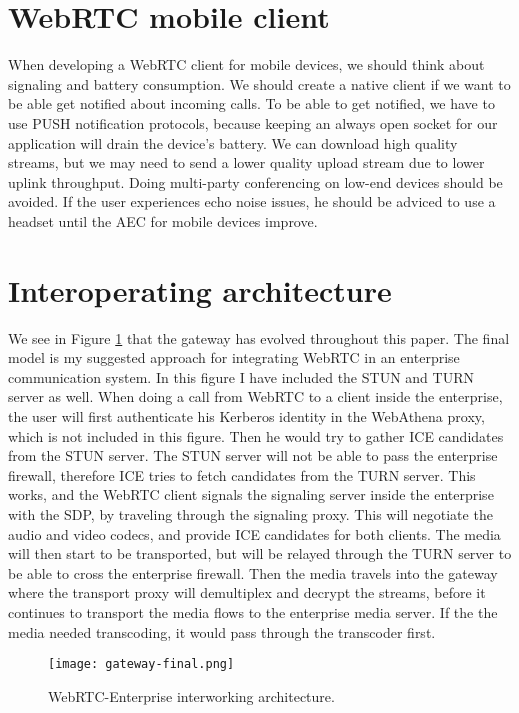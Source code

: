 \section{WebRTC mobile client}
When developing a WebRTC client for mobile devices, we should think about signaling and battery consumption. We should create a native client if we want to be able get notified about incoming calls. To be able to get notified, we have to use PUSH notification protocols, because keeping an always open socket for our application will drain the device's battery. We can download high quality streams, but we may need to send a lower quality upload stream due to lower uplink throughput. Doing multi-party conferencing on low-end devices should be avoided. If the user experiences echo noise issues, he should be adviced to use a headset until the AEC for mobile devices improve.

\section{Interoperating architecture}

We see in Figure \ref{fig:gateway-final} that the gateway has evolved throughout this paper. The final model is my suggested approach for integrating WebRTC in an enterprise communication system. In this figure I have included the STUN and TURN server as well. When doing a call from WebRTC to a client inside the enterprise, the user will first authenticate his Kerberos identity in the WebAthena proxy, which is not included in this figure. Then he would try to gather ICE candidates from the STUN server. The STUN server will not be able to pass the enterprise firewall, therefore ICE tries to fetch candidates from the TURN server. This works, and the WebRTC client signals the signaling server inside the enterprise with the SDP, by traveling through the signaling proxy. This will negotiate the audio and video codecs, and provide ICE candidates for both clients. The media will then start to be transported, but will be relayed through the TURN server to be able to cross the enterprise firewall. Then the media travels into the gateway where the transport proxy will demultiplex and decrypt the streams, before it continues to transport the media flows to the enterprise media server. If the the media needed transcoding, it would pass through the transcoder first.
\\
\begin{figure}[here]
\centerline{\texttt{[image: gateway-final.png]}}
\caption{WebRTC-Enterprise interworking architecture.}
\label{fig:gateway-final}
\end{figure}


